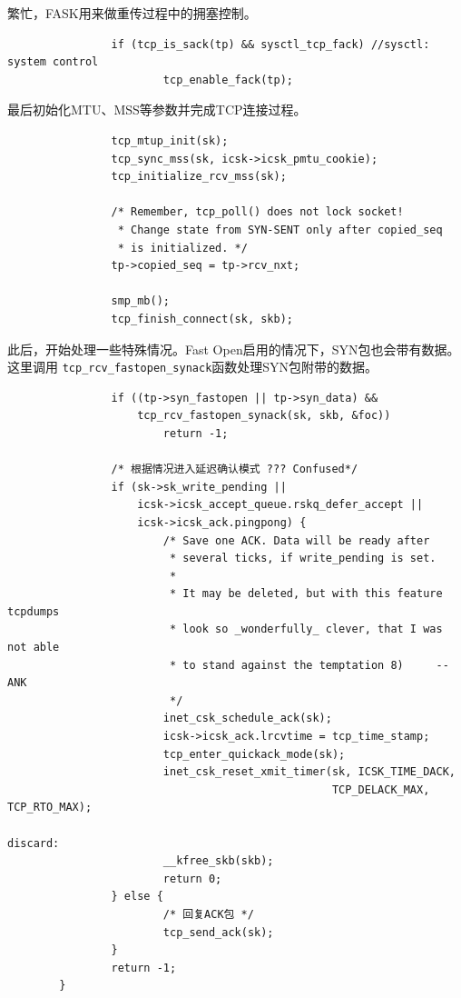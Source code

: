 繁忙，FASK用来做重传过程中的拥塞控制。
\begin{verbatim}
                if (tcp_is_sack(tp) && sysctl_tcp_fack) //sysctl: system control
                        tcp_enable_fack(tp);
\end{verbatim}
最后初始化MTU、MSS等参数并完成TCP连接过程。
\begin{verbatim}
                tcp_mtup_init(sk);
                tcp_sync_mss(sk, icsk->icsk_pmtu_cookie);
                tcp_initialize_rcv_mss(sk);

                /* Remember, tcp_poll() does not lock socket!
                 * Change state from SYN-SENT only after copied_seq
                 * is initialized. */
                tp->copied_seq = tp->rcv_nxt;

                smp_mb();
                tcp_finish_connect(sk, skb);
\end{verbatim}
此后，开始处理一些特殊情况。Fast Open启用的情况下，SYN包也会带有数据。这里调用
\texttt{tcp_rcv_fastopen_synack}函数处理SYN包附带的数据。
\begin{verbatim}
                if ((tp->syn_fastopen || tp->syn_data) &&
                    tcp_rcv_fastopen_synack(sk, skb, &foc))
                        return -1;
                
                /* 根据情况进入延迟确认模式 ??? Confused*/
                if (sk->sk_write_pending ||
                    icsk->icsk_accept_queue.rskq_defer_accept ||
                    icsk->icsk_ack.pingpong) {
                        /* Save one ACK. Data will be ready after
                         * several ticks, if write_pending is set.
                         *
                         * It may be deleted, but with this feature tcpdumps
                         * look so _wonderfully_ clever, that I was not able
                         * to stand against the temptation 8)     --ANK
                         */
                        inet_csk_schedule_ack(sk);
                        icsk->icsk_ack.lrcvtime = tcp_time_stamp;
                        tcp_enter_quickack_mode(sk);
                        inet_csk_reset_xmit_timer(sk, ICSK_TIME_DACK,
                                                  TCP_DELACK_MAX, TCP_RTO_MAX);

discard:
                        __kfree_skb(skb);
                        return 0;
                } else {
                        /* 回复ACK包 */
                        tcp_send_ack(sk);
                }
                return -1;
        }
\end{verbatim}

